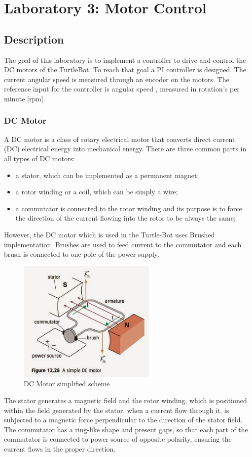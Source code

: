 \documentclass[english]{article}
\begin{document}
\clearpage

\section{Laboratory 3: Motor Control}
\subsection{Description}
The goal of this laboratory is to implement a controller to drive and 
control the DC motors of the TurtleBot. To reach that goal a PI controller is designed. The current angular speed is measured through an encoder on the motors. The reference input for the controller is angular speed , measured in rotation's per minute [rpm].
\subsubsection{DC Motor}
A DC motor is a class of rotary electrical motor that converts direct current (DC)
electrical energy into mechanical energy. There are three common parts in all types
of DC motors: 
\begin{itemize}
    \item a stator, which can be implemented as a permanent magnet; 
    \item a rotor winding or a coil, which can be simply a wire; 
    \item a commutator is connected to the rotor winding and its purpose is to force 
    the direction of the current flowing into the rotor to be always the same; 
\end{itemize}
However, the DC motor which is used in the Turtle-Bot uses Brushed implementation.
Brushes are used to feed current to the commutator and each brush is connected to
one pole of the power supply. 
\newpage
\begin{figure}[!h]
    \centering
    \includegraphics[width=0.60\textwidth, height=0.30\textheight]{figures/motorfig.png}
    \caption{DC Motor simplified scheme }
    \label{fig:motorfig}
\end{figure}
The stator generates a magnetic field and the rotor winding, which is positioned within
 the field generated by the stator, when a current flow through it, is subjected to a 
 magnetic force perpendicular to the direction of the stator field. The commutator has
  a ring-like shape and present gaps, so that each part of the commutator is connected
to power source of opposite polarity, ensuring the current flows in the proper
   direction. 
\end{document}
